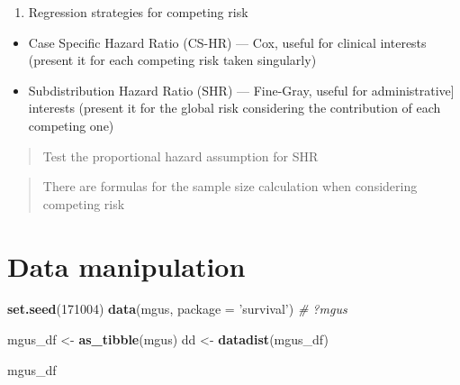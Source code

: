 \documentclass[]{book}
\newenvironment{Shaded}{\begin{snugshade}}{\end{snugshade}}
\newcommand{\KeywordTok}[1]{\textcolor[rgb]{0.13,0.29,0.53}{\textbf{{#1}}}}
\newcommand{\DataTypeTok}[1]{\textcolor[rgb]{0.13,0.29,0.53}{{#1}}}
\newcommand{\DecValTok}[1]{\textcolor[rgb]{0.00,0.00,0.81}{{#1}}}
\newcommand{\StringTok}[1]{\textcolor[rgb]{0.31,0.60,0.02}{{#1}}}
\newcommand{\CommentTok}[1]{\textcolor[rgb]{0.56,0.35,0.01}{\textit{{#1}}}}
\newcommand{\NormalTok}[1]{{#1}}
\providecommand{\tightlist}{%
  \setlength{\itemsep}{0pt}\setlength{\parskip}{0pt}}
\theoremstyle{definition}
\theoremstyle{definition}
\theoremstyle{definition}
\theoremstyle{remark}
\begin{document}
\begin{enumerate}
\def\labelenumi{\arabic{enumi}.}
\setcounter{enumi}{7}
\tightlist
\item
  Regression strategies for competing risk
\end{enumerate}

\begin{itemize}
\tightlist
\item
  Case Specific Hazard Ratio (CS-HR) --- Cox, useful for clinical
  interests (present it for each competing risk taken singularly)
\item
  Subdistribution Hazard Ratio (SHR) --- Fine-Gray, useful for
  administrative{]} interests (present it for the global risk
  considering the contribution of each competing one)
\end{itemize}

\begin{quote}
Test the proportional hazard assumption for SHR
\end{quote}

\begin{quote}
There are formulas for the sample size calculation when considering
competing risk
\end{quote}

\section{Data manipulation}\label{data-manipulation}

\begin{Shaded}
\begin{Highlighting}[]
\KeywordTok{set.seed}\NormalTok{(}\DecValTok{171004}\NormalTok{)}
\KeywordTok{data}\NormalTok{(mgus, }\DataTypeTok{package =} \StringTok{'survival'}\NormalTok{)}
\CommentTok{# ?mgus}

\NormalTok{mgus_df <-}\StringTok{ }\KeywordTok{as_tibble}\NormalTok{(mgus)}
\NormalTok{dd <-}\StringTok{ }\KeywordTok{datadist}\NormalTok{(mgus_df)}

\NormalTok{mgus_df}
\end{Highlighting}
\end{Shaded}
\end{document}
